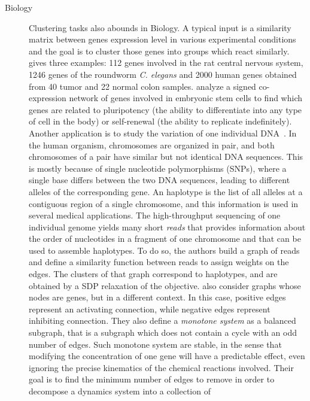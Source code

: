 \begin{description}
   \item[Biology]
      Clustering tasks also abounds in Biology.
      A typical input is a similarity matrix between genes expression level in various experimental conditions
      and the goal is to cluster those genes into groups which react similarly. \Textcite[Section
      4]{Ben-Dor99} gives three examples: 112 genes involved in the rat central nervous system, 1246
      genes of the roundworm \emph{C. elegans} and 2000 human genes obtained from 40 tumor and 22
      normal colon samples. \Textcite{Mason2009} analyze a signed co-expression network of genes
      involved in embryonic stem cells to find which genes are related to pluripotency (the ability
      to differentiate into any type of cell in the body) or self-renewal (the ability to replicate
      indefinitely). Another application is to study the variation of one individual
      DNA~\autocite{Das2015}. In the human organism, chromosomes are organized in pair, and both
      chromosomes of a pair have similar but not identical DNA sequences. This is mostly because of
      single nucleotide polymorphisms (SNPs), where a single base differs between the two DNA
      sequences, leading to different alleles of the corresponding gene. An haplotype is the list of
      all alleles at a contiguous region of a single chromosome, and this information is
      used in several medical applications. The high-throughput sequencing of one individual genome
      yields many short \emph{reads} that provides information about the order of nucleotides in a
      fragment of one chromosome and that can be used to assemble haplotypes. To do so, the authors
      build a graph of reads and define a similarity function between reads to assign weights on the
      edges. The clusters of that graph correspond to haplotypes, and are obtained by a SDP
      relaxation of the \pcc{} objective. \Textcite{monotoneBiology07} also consider graphs whose
      nodes are genes, but in a different context. In this case, positive edges represent an
      activating connection, while negative edges represent inhibiting connection. They also define
      a \emph{monotone system} as a balanced subgraph, that is a subgraph which does not contain a
      cycle with an odd number of edges. Such monotone system are stable, in the sense that
      modifying the concentration of one gene will have a predictable effect, even ignoring the
      precise kinematics of the chemical reactions involved. Their goal is to find the minimum
      number of edges to remove in order to decompose a dynamics system into a collection of

\end{description}
